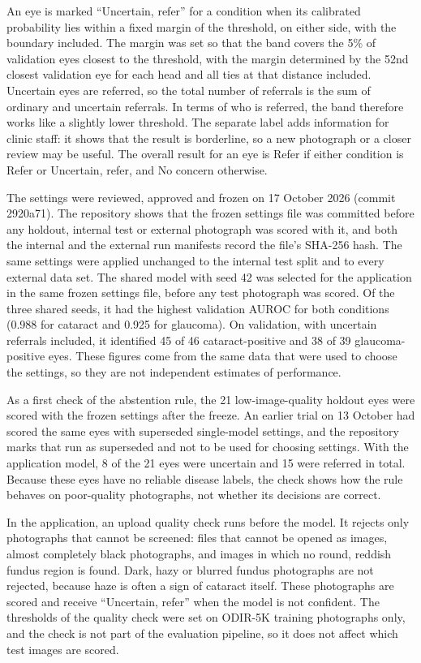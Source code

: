 \documentclass[conference,a4paper]{IEEEtran}
\begin{document}
An eye is marked ``Uncertain, refer'' for a condition when its calibrated probability lies within a
fixed margin of the threshold, on either side, with the boundary included. The margin was set so
that the band covers the 5\% of validation eyes closest to the threshold, with the margin determined by the 52nd closest validation eye for each head and all ties at that distance included. Uncertain eyes are referred, so the total number of referrals is the sum of
ordinary and uncertain referrals. In terms of who is referred, the band therefore works like a
slightly lower threshold. The separate label adds information for clinic staff: it shows that the
result is borderline, so a new photograph or a closer review may be useful. The overall result for
an eye is Refer if either condition is Refer or Uncertain, refer, and No concern otherwise.

The settings were reviewed, approved and frozen on 17 October 2026 (commit 2920a71). The repository
shows that the frozen settings file was committed before any holdout, internal test or external
photograph was scored with it, and both the internal and the external run manifests record the
file's SHA-256 hash. The same settings were applied unchanged to the internal test split and to
every external data set. The shared model with seed 42 was selected for the application in the same
frozen settings file, before any test photograph was scored. Of the three shared seeds, it had the
highest validation AUROC for both conditions (0.988 for cataract and 0.925 for glaucoma). On
validation, with uncertain referrals included, it identified 45 of 46 cataract-positive and 38 of 39
glaucoma-positive eyes. These figures come from the same data that were used to choose the settings,
so they are not independent estimates of performance.

As a first check of the abstention rule, the 21 low-image-quality holdout eyes were scored with the
frozen settings after the freeze. An earlier trial on 13 October had scored the same eyes with
superseded single-model settings, and the repository marks that run as superseded and not to be used
for choosing settings. With the application model, 8 of the 21 eyes were uncertain and 15 were
referred in total. Because these eyes have no reliable disease labels, the check shows how the rule
behaves on poor-quality photographs, not whether its decisions are correct.

In the application, an upload quality check runs before the model. It rejects only photographs that
cannot be screened: files that cannot be opened as images, almost completely black photographs, and
images in which no round, reddish fundus region is found. Dark, hazy or blurred fundus photographs
are not rejected, because haze is often a sign of cataract itself. These photographs are scored and
receive ``Uncertain, refer'' when the model is not confident. The thresholds of the quality check
were set on ODIR-5K training photographs only, and the check is not part of the evaluation pipeline,
so it does not affect which test images are scored.
\end{document}
